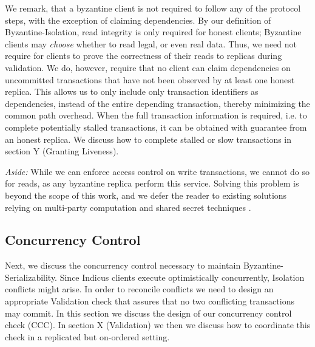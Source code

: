 We remark, that a byzantine client is not required to follow any of the protocol steps, with the exception of claiming dependencies. By our definition of Byzantine-Isolation, read integrity is only required for honest clients; Byzantine clients may \textit{choose} whether to read legal, or even real data. Thus, we need not require for clients to prove the correctness of their reads to replicas during validation. We do, however, require that no client can claim dependencies on uncommitted transactions that have not been observed by at least one honest replica. This allows us to only include only transaction identifiers as dependencies, instead of the entire depending transaction, thereby minimizing the common path overhead. When the full transaction information is required, i.e. to complete potentially stalled transactions, it can be obtained with guarantee from an honest replica. We discuss how to complete stalled or slow transactions in section Y (Granting Liveness).

\textit{Aside:} While we can enforce access control on write transactions, we cannot do so for reads, as any byzantine replica perform this service. Solving this problem is beyond the scope of this work, and we defer the reader to existing solutions relying on multi-party computation and shared secret techniques \cite{basu2019efficient}.

\subsection{Concurrency Control}
Next, we discuss the concurrency control necessary to maintain Byzantine-Serializability. Since Indicus clients execute optimistically concurrently, Isolation conflicts might arise. In order to reconcile conflicts we need to design an appropriate Validation check that assures that no two conflicting transactions may commit. In this section we discuss the design of our concurrency control check (CCC). In section X (Validation) we then we discuss how to coordinate this check in a replicated but on-ordered setting.



